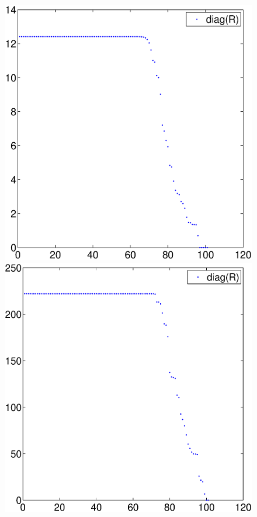 \begin{figure}[t]
\begin{minipage}{.492\columnwidth}
\end{minipage}
\begin{minipage}{.492\columnwidth}
  \centering
  \includegraphics[width=\columnwidth]{fig/straight-path-noisefree-spqr.eps}
\end{minipage}
\begin{minipage}{.492\columnwidth}
  \centering
  \includegraphics[width=\columnwidth]{fig/straight-path-spqr.eps}

\end{minipage}
\end{figure}
